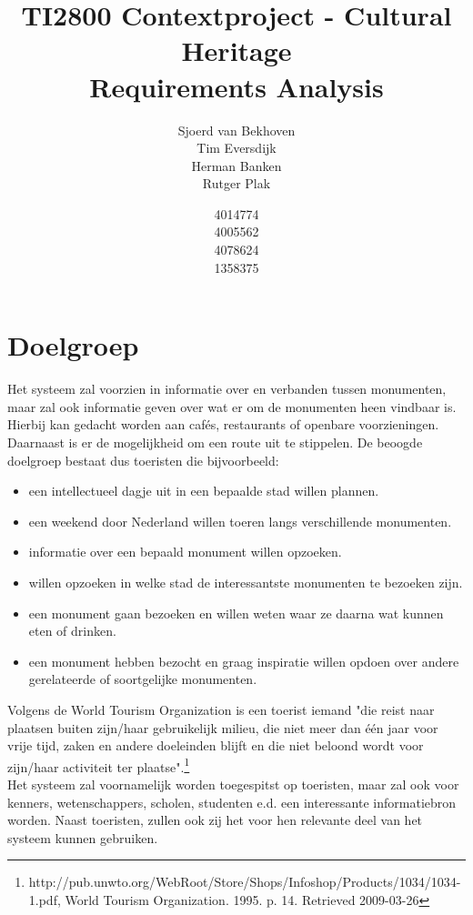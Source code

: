 \documentclass{article}
\begin{document}
\title{TI2800 Contextproject - Cultural Heritage \\ Requirements Analysis}
\author{Sjoerd van Bekhoven \\ Tim Eversdijk \\ Herman Banken \\ Rutger Plak \and 4014774 \\ 4005562 \\ 4078624 \\ 1358375}
\maketitle

\section{Doelgroep}
Het systeem zal voorzien in informatie over en verbanden tussen monumenten, maar zal ook informatie geven over wat er om de monumenten heen vindbaar is. Hierbij kan gedacht worden aan caf\'es, restaurants of openbare voorzieningen. Daarnaast is er de mogelijkheid om een route uit te stippelen. De beoogde doelgroep bestaat dus toeristen die bijvoorbeeld:
\begin{itemize}
		\item{een intellectueel dagje uit in een bepaalde stad willen plannen.}
		\item{een weekend door Nederland willen toeren langs verschillende monumenten.}
		\item{informatie over een bepaald monument willen opzoeken.}
		\item{willen opzoeken in welke stad de interessantste monumenten te bezoeken zijn.}
		\item{een monument gaan bezoeken en willen weten waar ze daarna wat kunnen eten of drinken.}
		\item{een monument hebben bezocht en graag inspiratie willen opdoen over andere gerelateerde of soortgelijke monumenten.}
\end{itemize}
Volgens de World Tourism Organization is een toerist iemand "die reist naar plaatsen buiten zijn/haar gebruikelijk milieu, die niet meer dan \'e\'en jaar voor vrije tijd, zaken en andere doeleinden blijft en die niet beloond wordt voor zijn/haar activiteit ter plaatse".\footnote{http://pub.unwto.org/WebRoot/Store/Shops/Infoshop/Products/1034/1034-1.pdf, World Tourism Organization. 1995. p. 14. Retrieved 2009-03-26} \\
Het systeem zal voornamelijk worden toegespitst op toeristen, maar zal ook voor kenners, wetenschappers, scholen, studenten e.d. een interessante informatiebron worden. Naast toeristen, zullen ook zij het voor hen relevante deel van het systeem kunnen gebruiken.
\clearpage
\end{document}
